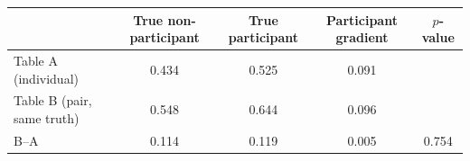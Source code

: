 \begin{tabular}{lcccc}
\toprule
 & True non-participant & True participant & Participant gradient & $p$-value\\
\midrule
Table A (individual) & 0.434 & 0.525 & 0.091 & \\
Table B (pair, same truth) & 0.548 & 0.644 & 0.096 & \\
B--A & 0.114 & 0.119 & 0.005 & 0.754\\
\bottomrule
\end{tabular}
